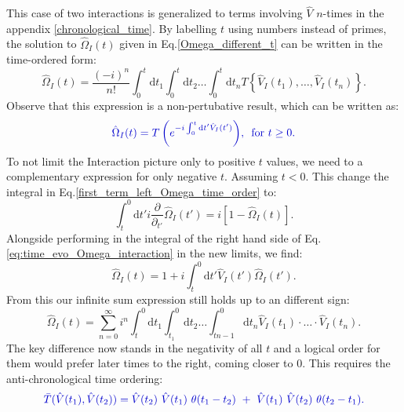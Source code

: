 \documentclass[12pt, titlepage]{article}
\begin{document}
This case of two interactions is generalized to terms involving $\hat{V} $ $ n $-times in the appendix \ref{chronological_time}.  
By labelling $ t $  using numbers instead of primes, the solution to $ \hat{\Omega}_{I}(t) $ given in Eq.\enskip\eqref{Omega_different_t} can be written in the time-ordered form:
\begin{equation}
\hat{\Omega}_{I}(t)
=
\frac{(-i)^{n}}{n!}
\int_{0}^{t}\mathrm{d}t_1\int_{0}^{t}\! \! \mathrm{d}t_2
 \ldots
 \int_{0}^{t}\! \! \mathrm{d}t_n
 T\left\lbrace \hat{V}_{I}(t_1), \ldots , \hat{V}_{I}(t_n)\right\rbrace 
 .
\end{equation}
Observe that this expression is a non-pertubative result, which can  be written as:
\begin{equation}\label{eq:Omega_I_Chron_0}
\textcolor[RGB]{0,0,204}{
\hat{\Omega}_{I}(t)
=T\left( e^{-i\int_{0}^{t}\mathrm{d}t^{\prime} \hat{V}_{I}(t^{\prime})} \right)
	\! ,\text{\enskip for  }  t\geq 0 
	.}
\end{equation}
To not limit the Interaction picture only to positive $ t $ values, we need to a complementary expression for only negative $ t $. Assuming $ t<0 $. This change the integral in Eq.\enskip\eqref{first_term_left_Omega_time_order} to:
 \begin{equation}\label{first_term_left_anti_chrono}
 \int_{t}^{0}\mathrm{d}t'
 i
 \frac{\partial}{\partial_{t'}} 
 \hat{\Omega}_{I} (t')
 =
 i
 \left[ 
1 -\hat{\Omega}_{I}(t)
 \right] .
 \end{equation}
 Alongside performing in the integral of the right hand side of  Eq.\enskip\eqref{eq:time_evo_Omega_interaction} in the new limits, we find:
 \begin{equation}
  \hat{\Omega}_{I}(t)=
1
+
i
\int^{0}_{t}\mathrm{d}t'\hat{V}_{I}(t')\hat{\Omega}_{I}(t')	.
  \end{equation} 
From this our infinite sum expression still holds up to an different sign:
\begin{equation}
\hat{\Omega}_{I}(t) =
\sum\limits_{n=0}^{\infty} 
i^{n}
\int^{0}_{t}\mathrm{d}t_1\int^{0}_{t_{1}}\! \! \mathrm{d}t_2
 \ldots
 \int^{0}_{tn-1}\! \! \mathrm{d}t_n
  \hat{V}_{I}(t_1)\cdot \ldots \cdot \hat{V}_{I}(t_n).
\end{equation}
The key difference now stands in the negativity of all $ t $ and a logical order for them would prefer later times to the right, coming closer to $ 0 $. This requires the anti-chronological time ordering:
 \begin{equation}\label{eq:anti-chron-time_ordering}
\textcolor[RGB]{0,0,204}{
\bar{T}(\hat{V}(t_1), \hat{V}(t_2))=\hat{V}(t_2)\ \hat{V}(t_1)\ \theta (t_1 -t_2)\ +\ \hat{V}(t_1)\  \hat{V}(t_2) \ \theta (t_2-t_1)
.}
\end{equation}
\end{document}

